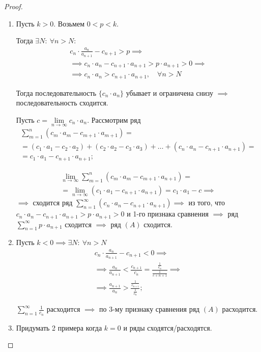 \documentclass{report}
\theoremstyle{definition}
\begin{document}
\begin{proof}
  \begin{enumerate}
    \item Пусть $k > 0$. Возьмем $0 < p < k$.

          Тогда $\exists N : \ \forall n > N$:
          \begin{multline*}
            c_n \cdot \frac{a_n}{a_{n+1}} - c_{n+1}>p \implies \\
            \implies c_n \cdot a_n - c_{n+1} \cdot a_{n+1} > p \cdot a_{n+1} > 0 \implies \\
            \implies c_n \cdot a_n > c_{n+1} \cdot a_{n+1}, \quad \forall n > N
          \end{multline*}

          Тогда последовательность $\{c_n\cdot a_n\}$ убывает и ограничена снизу $\implies$ последовательность сходится.

          Пусть $c=\underset{n\rightarrow\infty}{\lim}c_n\cdot a_n$. Рассмотрим ряд
          \begin{multline*}
            \sum_{m=1}^{n}(c_m\cdot a_m - c_{m+1}\cdot a_{m+1}) = \\
            = (c_1 \cdot a_1 - c_2 \cdot a_2) + (c_2 \cdot a_2 - c_3 \cdot a_3) + \ldots + (c_n \cdot a_n - c_{n+1}\cdot a_{n+1}) = \\
            = c_1 \cdot a_1 - c_{n+1} \cdot a_{n+1};
          \end{multline*}

          \begin{multline*}
            \underset{n\rightarrow\infty}{\lim}\sum_{m=1}^{n}(c_m \cdot a_m - c_{m+1} \cdot a_{n+1}) = \\
            = \underset{n\rightarrow\infty}{\lim}(c_1 \cdot a_1 - c_{n+1} \cdot a_{n+1}) = c_1 \cdot a_1 - c \implies
          \end{multline*}
          $\implies$ сходится ряд $\sum_{n=1}^{\infty}(c_n \cdot a_n - c_{n+1} \cdot a_{n+1}) \implies$ из того, что $c_n \cdot a_n - c_{n+1} \cdot a_{n+1} > p \cdot a_{n+1} > 0$ и 1-го признака сравнения $\implies$ ряд $\sum_{n=1}^{\infty}p\cdot a_{n+1}$ сходится $\implies$ ряд $(A)$ сходится.

    \item Пусть $k < 0 \implies \exists N: \ \forall n > N$
          \begin{multline*}
            c_n \cdot \frac{a_n}{a_{n+1}} - c_{n+1} < 0 \implies \\
            \implies \frac{a_n}{a_{n+1}} < \frac{c_{n+1}}{c_n} = \frac{\frac{1}{c_n}}{\frac{1}{c+{n+1}}} \implies \\
            \implies \frac{a_{n+1}}{a_{n}} > \frac{\frac{1}{c_{n+1}}}{\frac{1}{c_n}};
          \end{multline*}

          $\sum_{n=1}^{\infty}\frac{1}{c_n}$ расходится $\implies$ по 3-му признаку сравнения ряд $(A)$ расходится.

    \item Придумать 2 примера когда $k=0$ и ряды сходятся/расходятся.
  \end{enumerate}
\end{proof}
\end{document}
